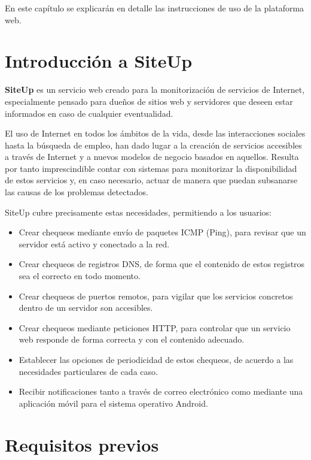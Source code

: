En este capítulo se explicarán en detalle las instrucciones de uso de la
plataforma web.

\section{Introducción a SiteUp}

\textbf{SiteUp} es un servicio web creado para la monitorización de servicios de
Internet, especialmente pensado para dueños de sitios web y servidores que
deseen estar informados en caso de cualquier eventualidad.

El uso de Internet en todos los ámbitos de la vida, desde las interacciones
sociales hasta la búsqueda de empleo, han dado lugar a la creación de servicios
accesibles a través de Internet y a nuevos modelos de negocio basados en
aquellos. Resulta por tanto imprescindible contar con sistemas para monitorizar
la disponibilidad de estos servicios y, en caso necesario, actuar de manera que
puedan subsanarse las causas de los problemas detectados.

SiteUp cubre precisamente estas necesidades, permitiendo a los usuarios:

\begin{itemize}
\item Crear chequeos mediante envío de paquetes ICMP (Ping), para revisar que un
  servidor está activo y conectado a la red.
\item Crear chequeos de registros DNS, de forma que el contenido de estos
  registros sea el correcto en todo momento.
\item Crear chequeos de puertos remotos, para vigilar que los servicios
  concretos dentro de un servidor son accesibles.
\item Crear chequeos mediante peticiones HTTP, para controlar que un servicio
  web responde de forma correcta y con el contenido adecuado.
\item Establecer las opciones de periodicidad de estos chequeos, de acuerdo a
  las necesidades particulares de cada caso.
\item Recibir notificaciones tanto a través de correo electrónico como mediante
  una aplicación móvil para el sistema operativo Android.
\end{itemize}

\section{Requisitos previos}

